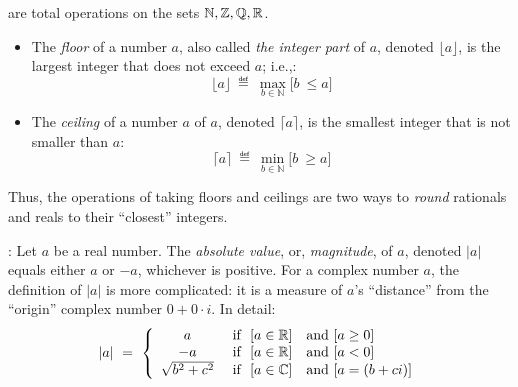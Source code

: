 are total operations on the sets $\mathbb{N}, \mathbb{Z}, \mathbb{Q}, \mathbb{R}$.
\begin{itemize}
\item
The {\it floor} of a number $a$, also called {\it the integer part}
of $a$, denoted $\lfloor a \rfloor$, is the largest integer that does
not exceed $a$; i.e.,:
\[
\lfloor a \rfloor \ \eqdef \ \max_{b \in {\mathbb{N}}} \Big[ b \ \leq a \Big]
\]
\item
The {\it ceiling} of a number $a$
of $a$, denoted $\lceil a \rceil$, is the smallest integer that is 
not smaller than $a$:
\[
\lceil a \rceil \ \eqdef \ \min_{b \in {\mathbb{N}}} \Big[ b \ \geq a \Big]
\]
\end{itemize}
Thus, the operations of taking floors and ceilings are two ways to
{\em round} rationals and reals to their ``closest''
integers.

\medskip

:
%
Let $a$ be a real number.  The {\it absolute value}, or, {\it
  magnitude}, of $a$, denoted $|a|$ equals either $a$ or $-a$,
whichever is positive.  For a complex number $a$, the definition of
$|a|$ is more complicated: it is a measure of $a$'s ``distance'' from
the ``origin'' complex number $0 + 0 \cdot i$.  In detail:
\[
|a| \ = \ \left\{
\begin{array}{cl}
a & \mbox{ if } \ [a \in \mathbb{R}] \ \ \mbox{ and } [a \geq 0] \\
-a & \mbox{ if } \ [a \in \mathbb{R}] \ \ \mbox{ and } [a < 0] \\
\sqrt{b^2 + c^2} &  \mbox{ if } \ [a \in \mathbb{C}]  \ \ \mbox{ and } [a = (b+ci)]
\end{array}
\right.
\]

\medskip

